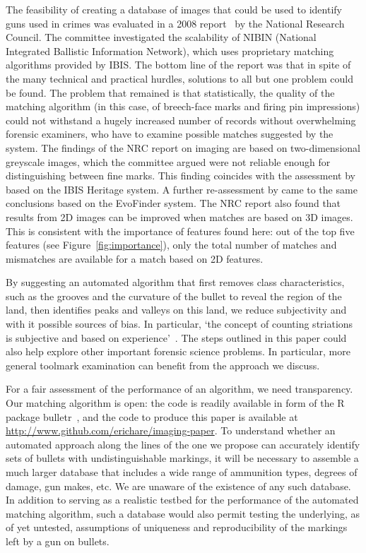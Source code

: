 \documentclass[aoas, preprint]{imsart}\usepackage[]{graphicx}\usepackage[]{color}
\begin{document}
The feasibility of creating a database of images that could be used to identify guns used in crimes was evaluated in a 2008 report~\citep{nap:2008} by the National Research Council. The committee investigated the scalability of NIBIN (National Integrated Ballistic Information Network), which uses proprietary matching algorithms provided by IBIS. The bottom line of the report was that in spite of the many technical and practical hurdles, solutions to all but one problem could be found. The problem that remained is that statistically, the quality of the matching algorithm (in this case, of breech-face marks and firing pin impressions) could not withstand a hugely increased number of records without overwhelming forensic examiners, who have to examine possible matches suggested by the system. 
The findings of the NRC report on imaging are based on two-dimensional greyscale images, which the committee argued were not reliable enough for distinguishing between fine marks. This finding coincides with the assessment by \citet{dekinder:2004} based on the IBIS Heritage system. A further re-assessment by \citet{deceuster:2015} came to the same conclusions based on the EvoFinder system. 
The NRC report also found that results from 2D images can be improved when matches are based on 3D images. This is consistent with the importance of features found here: out of the top five features (see Figure~\ref{fig:importance}), only the total number of matches and mismatches are available for a match based on 2D features.

By suggesting an automated algorithm that first removes class characteristics, such as the grooves and the curvature of the bullet to reveal the region of the  land, then identifies peaks and valleys on this land, we reduce subjectivity and with it possible sources of bias. In particular, `the concept of counting striations is subjective and based on experience'~\citep{miller:1998}. The steps outlined in this paper could also help explore other important forensic science problems. In particular, more general toolmark examination can benefit from the approach we discuss.

For a fair assessment of the performance of an algorithm, we need transparency. Our matching  algorithm is open: the code is readily available in form of the R package bulletr~\citep{bulletr}, and the code to produce this paper is available at \url{http://www.github.com/erichare/imaging-paper}. To understand whether an automated approach along the lines of the one we propose can accurately identify sets of bullets with undistinguishable markings, it will be necessary to assemble a much larger database that includes a wide range of ammunition types, degrees of damage, gun makes, etc. We are unaware of the existence of any such database. In addition to serving as a realistic testbed for the performance of the automated matching algorithm, such a database would also permit testing the underlying, as of yet untested, assumptions of uniqueness and reproducibility of the markings left by a gun on bullets.
\end{document}
